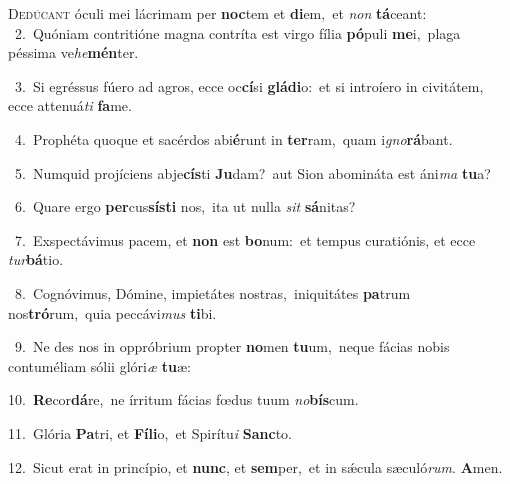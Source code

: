 \lettrine{\initial\textcolor{\initialcolor}{D}}{edúcant} óculi mei lácrimam per \textbf{noc}\-tem et \textbf{di}\-em,~\star et \textit{non} \textbf{tá}\-ceant:\\
{\numbfont\textcolor{\numbcolor}{~2.}}~Quóniam contritióne magna contríta est virgo fília \textbf{pó}\-puli \textbf{me}\-i,~\star plaga péssima ve\-\textit{he}\-\textbf{mén}ter.\par
{\numbfont\textcolor{\numbcolor}{~3.}}~Si egréssus fúero ad agros, ecce oc\-\textbf{cí}\-si \textbf{glá}\-\textbf{di}o:~\star et si introíero in civitátem, ecce attenuá\textit{ti} \textbf{fa}\-me.\par
{\numbfont\textcolor{\numbcolor}{~4.}}~Prophéta quoque et sacérdos abi\-\textbf{é}\-runt in \textbf{ter}\-ram,~\star quam i\-\textit{gno}\-\textbf{rá}bant.\par
{\numbfont\textcolor{\numbcolor}{~5.}}~Numquid projíciens abje\-\textbf{cís}\-ti \textbf{Ju}\-dam?~\star aut Sion abomináta est áni\textit{ma} \textbf{tu}\-a?\par
{\numbfont\textcolor{\numbcolor}{~6.}}~Quare ergo \textbf{per}\-cus\-\textbf{sís}\-\textbf{ti} nos,~\star ita ut nulla \textit{sit} \textbf{sá}\-nitas?\par
{\numbfont\textcolor{\numbcolor}{~7.}}~Exspectávimus pacem, et \textbf{non} est \textbf{bo}\-num:~\star et tempus curatiónis, et ecce \textit{tur}\-\textbf{bá}tio.\par
{\numbfont\textcolor{\numbcolor}{~8.}}~Cognóvimus, Dómine, impietátes nostras,~\dagger iniquitátes \textbf{pa}\-trum nos\-\textbf{tró}\-rum,~\star quia peccávi\textit{mus} \textbf{ti}\-bi.\par
{\numbfont\textcolor{\numbcolor}{~9.}}~Ne des nos in oppróbrium propter \textbf{no}\-men \textbf{tu}\-um,~\star neque fácias nobis contuméliam sólii glóri\textit{æ} \textbf{tu}\-æ:\par
{\numbfont\textcolor{\numbcolor}{10.}}~\-\textbf{Re}\-cor\-\textbf{dá}\-re,~\star ne írritum fácias fœdus tuum \textit{no}\-\textbf{bís}cum.\par
{\numbfont\textcolor{\numbcolor}{11.}}~Glória \textbf{Pa}\-tri, et \textbf{Fí}\-\textbf{li}o,~\star et Spirítu\textit{i} \textbf{Sanc}\-to.\par
{\numbfont\textcolor{\numbcolor}{12.}}~Sicut erat in princípio, et \textbf{nunc}\-, et \textbf{sem}\-per,~\star et in sǽcula sæculó\-\textit{rum}\-. \textbf{A}\-men.\par
